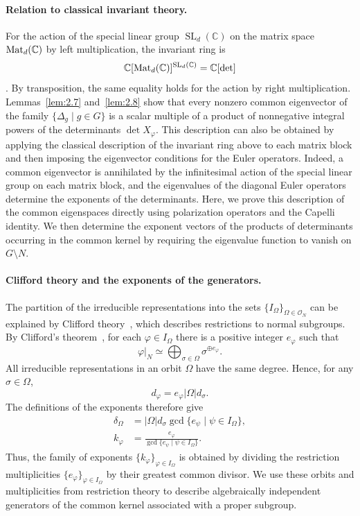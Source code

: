 \documentclass[12pt,a4paper]{article}
\theoremstyle{definition}
\numberwithin{definition}{section}
\newcommand{\Mat}{{\rm Mat}}
\DeclareMathOperator{\SL}{SL}
\begin{document}
\paragraph{Relation to classical invariant theory.}
For the action of the special linear group $\SL_d(\mathbb C)$ on the
matrix space $\Mat_d(\mathbb C)$ by left multiplication, the invariant ring is
\[
\mathbb C[\Mat_d(\mathbb C)]^{\SL_d(\mathbb C)}
=\mathbb C[\det]
\]
\cite[Section~1.2, Example~2]{KraftProcesi1996}.
By transposition, the same equality holds for the action by right multiplication.
Lemmas~\ref{lem:2.7} and~\ref{lem:2.8} show that every nonzero common
eigenvector of the family $\{\Delta_g\mid g\in G\}$ is a scalar multiple
of a product of nonnegative integral powers of the determinants
$\det X_\varphi$.
This description can also be obtained by applying the classical description
of the invariant ring above to each matrix block and then imposing the
eigenvector conditions for the Euler operators.
Indeed, a common eigenvector is annihilated by the infinitesimal action of
the special linear group on each matrix block, and the eigenvalues of the
diagonal Euler operators determine the exponents of the determinants.
Here, we prove this description of the common eigenspaces directly using
polarization operators and the Capelli identity.
We then determine the exponent vectors of the products of determinants
occurring in the common kernel by requiring the eigenvalue function to
vanish on $G\setminus N$.

\paragraph{Clifford theory and the exponents of the generators.}
The partition of the irreducible representations into the sets
$\{I_\Omega\}_{\Omega\in\mathcal O_N}$ can be explained by Clifford
theory~\cite{Clifford1937}, which describes restrictions to normal subgroups.
By Clifford's theorem~\cite[Theorem~6.2]{MR460423}, for each
$\varphi\in I_\Omega$ there is a positive integer $e_\varphi$ such that
\[
\varphi|_N\simeq
\bigoplus_{\sigma\in\Omega}\sigma^{\oplus e_\varphi}.
\]
All irreducible representations in an orbit $\Omega$ have the same degree.
Hence, for any $\sigma\in\Omega$,
\[
d_\varphi=e_\varphi|\Omega|d_\sigma.
\]
The definitions of the exponents therefore give
\[
\begin{aligned}
\delta_\Omega
&=|\Omega|d_\sigma\gcd\{e_\psi\mid\psi\in I_\Omega\},\\
k_\varphi
&=\frac{e_\varphi}{\gcd\{e_\psi\mid\psi\in I_\Omega\}}.
\end{aligned}
\]
Thus, the family of exponents $\{k_\varphi\}_{\varphi\in I_\Omega}$ is
obtained by dividing the restriction multiplicities
$\{e_\varphi\}_{\varphi\in I_\Omega}$ by their greatest common divisor.
We use these orbits and multiplicities from restriction theory to describe
algebraically independent generators of the common kernel associated with
a proper subgroup.
\end{document}
